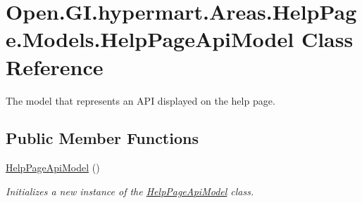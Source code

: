 \hypertarget{class_open_1_1_g_i_1_1hypermart_1_1_areas_1_1_help_page_1_1_models_1_1_help_page_api_model}{}\section{Open.\+G\+I.\+hypermart.\+Areas.\+Help\+Page.\+Models.\+Help\+Page\+Api\+Model Class Reference}
\label{class_open_1_1_g_i_1_1hypermart_1_1_areas_1_1_help_page_1_1_models_1_1_help_page_api_model}


The model that represents an A\+P\+I displayed on the help page.  


\subsection*{Public Member Functions}
\begin{DoxyCompactItemize}
\item 
\hyperlink{class_open_1_1_g_i_1_1hypermart_1_1_areas_1_1_help_page_1_1_models_1_1_help_page_api_model_a34aa95dfea87b53bcfac8601fb1f3b93}{Help\+Page\+Api\+Model} ()
\begin{DoxyCompactList}\small\item\em Initializes a new instance of the \hyperlink{class_open_1_1_g_i_1_1hypermart_1_1_areas_1_1_help_page_1_1_models_1_1_help_page_api_model}{Help\+Page\+Api\+Model} class. \end{DoxyCompactList}\end{DoxyCompactItemize}
